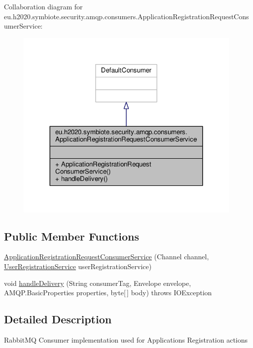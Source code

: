 Collaboration diagram for eu.\+h2020.\+symbiote.\+security.\+amqp.\+consumers.\+Application\+Registration\+Request\+Consumer\+Service\+:
\nopagebreak
\begin{figure}[H]
\begin{center}
\leavevmode
\includegraphics[width=312pt]{classeu_1_1h2020_1_1symbiote_1_1security_1_1amqp_1_1consumers_1_1ApplicationRegistrationRequestConsumerService__coll__graph}
\end{center}
\end{figure}
\subsection*{Public Member Functions}
\begin{DoxyCompactItemize}
\item 
\hyperlink{classeu_1_1h2020_1_1symbiote_1_1security_1_1amqp_1_1consumers_1_1ApplicationRegistrationRequestConsumerService_a33e736ed17c521abd360c3f99878f867}{Application\+Registration\+Request\+Consumer\+Service} (Channel channel, \hyperlink{classeu_1_1h2020_1_1symbiote_1_1security_1_1services_1_1UserRegistrationService}{User\+Registration\+Service} user\+Registration\+Service)
\item 
void \hyperlink{classeu_1_1h2020_1_1symbiote_1_1security_1_1amqp_1_1consumers_1_1ApplicationRegistrationRequestConsumerService_a9a0833ca543b20f7686a6d45b4f2ea88}{handle\+Delivery} (String consumer\+Tag, Envelope envelope, A\+M\+Q\+P.\+Basic\+Properties properties, byte\mbox{[}$\,$\mbox{]} body)  throws I\+O\+Exception 
\end{DoxyCompactItemize}


\subsection{Detailed Description}
Rabbit\+MQ Consumer implementation used for Applications\textquotesingle{} Registration actions

